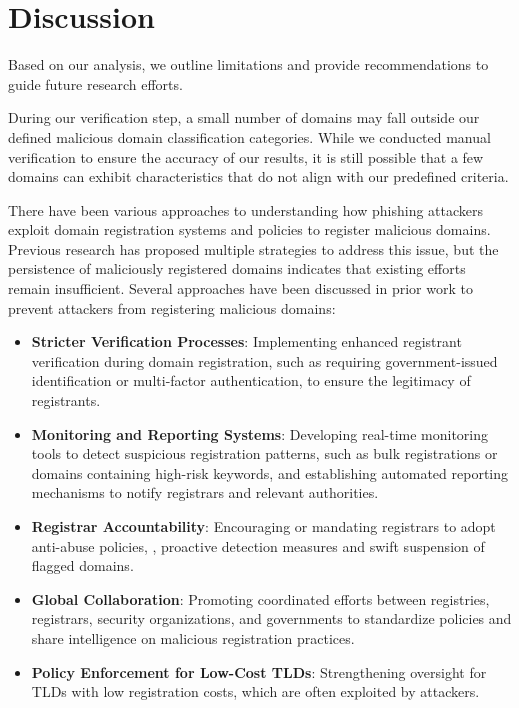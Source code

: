 \section{Discussion}
\label{sec:discussion}
Based on our analysis, we outline limitations and provide recommendations to guide future research efforts.

During our verification step, a small number of domains may fall outside our defined malicious domain classification categories. 
While we conducted manual verification to ensure the accuracy of our results, it is still possible that a few domains can exhibit characteristics that do not align with our predefined criteria. 

There have been various approaches to understanding how phishing attackers exploit domain registration systems and policies to register malicious domains. Previous research has proposed multiple strategies to address this issue, but the persistence of maliciously registered domains indicates that existing efforts remain insufficient. Several approaches have been discussed in prior work to prevent attackers from registering malicious domains:
\begin{itemize}[leftmargin=*, topsep=0pt, itemsep=0em]
    \item \textbf{Stricter Verification Processes}: Implementing enhanced registrant verification during domain registration, such as requiring government-issued identification or multi-factor authentication, to ensure the legitimacy of registrants.
    \item \textbf{Monitoring and Reporting Systems}: Developing real-time monitoring tools to detect suspicious registration patterns, such as bulk registrations or domains containing high-risk keywords, and establishing automated reporting mechanisms to notify registrars and relevant authorities.
    \item \textbf{Registrar Accountability}: Encouraging or mandating registrars to adopt anti-abuse policies, \eg,  proactive detection measures and swift suspension of flagged domains.
    \item \textbf{Global Collaboration}: Promoting coordinated efforts between registries, registrars, security organizations, and governments to standardize policies and share intelligence on malicious registration practices.
    \item \textbf{Policy Enforcement for Low-Cost TLDs}: Strengthening oversight for TLDs with low registration costs, which are often exploited by attackers.
\end{itemize}
